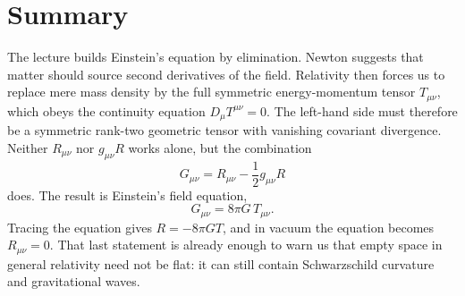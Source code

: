 \section{Summary}

The lecture builds Einstein's equation by elimination. Newton suggests that matter should source second derivatives of the field. Relativity then forces us to replace mere mass density by the full symmetric energy-momentum tensor \(T_{\mu\nu}\), which obeys the continuity equation \(D_\mu T^{\mu\nu}=0\). The left-hand side must therefore be a symmetric rank-two geometric tensor with vanishing covariant divergence. Neither \(R_{\mu\nu}\) nor \(g_{\mu\nu}R\) works alone, but the combination
\begin{equation}
G_{\mu\nu}=R_{\mu\nu}-\frac12 g_{\mu\nu}R
\end{equation}
does. The result is Einstein's field equation,
\begin{equation}
G_{\mu\nu}=8\pi G\,T_{\mu\nu}.
\end{equation}
Tracing the equation gives \(R=-8\pi G T\), and in vacuum the equation becomes \(R_{\mu\nu}=0\). That last statement is already enough to warn us that empty space in general relativity need not be flat: it can still contain Schwarzschild curvature and gravitational waves.